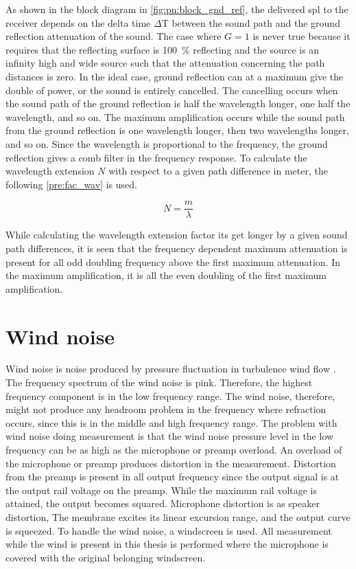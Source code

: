 As shown in the block diagram in \autoref{fig:pn:block_gnd_ref}, the delivered \gls{spl} to the receiver depends on the delta time $\Delta$T between the sound path and the ground reflection attenuation of the sound. The case where $G=1$ is never true because it requires that the reflecting surface is \SI{100}{\percent} reflecting and the source is an infinity high and wide source such that the attenuation concerning the path distances is zero. In the ideal case, ground reflection can at a maximum give the double of power,  or the sound is entirely cancelled. The cancelling occurs when the sound path of the ground reflection is half the wavelength longer, one half the wavelength, and so on. The maximum amplification occurs while the sound path from the ground reflection is one wavelength longer, then two wavelengths longer, and so on. Since the wavelength is proportional to the frequency, the ground reflection gives a comb filter in the frequency response. To calculate the wavelength extension $N$ with respect to a given path difference in meter, the following \autoref{pre:fac_wav} is used.

\begin{equation}\label{pre:fac_wav}
N = \frac{m}{\lambda}
\end{equation}  

\startexplain
{}
\stopexplain


While calculating the wavelength extension factor its get longer by a given sound path differences, it is seen that the frequency dependent maximum attenuation is present for all odd doubling frequency above the first maximum attenuation. In the maximum amplification, it is all the even doubling of the first maximum amplification.


\section{Wind noise}\label{pre:wind_noise}
Wind noise is noise produced by pressure fluctuation in turbulence wind flow \citep{doi:10.1121/1.4780400}. The frequency spectrum of the wind noise is pink. Therefore, the highest frequency component is in the low frequency range. The wind noise, therefore, might not produce any headroom problem in the frequency where refraction occurs, since this is in the middle and high frequency range. The problem with wind noise doing measurement is that the wind noise pressure level in the low frequency can be as high as the microphone or preamp overload. An overload of the microphone or preamp produces distortion in the measurement. Distortion from the preamp is present in all output frequency since the output signal is at the output rail voltage on the preamp. While the maximum rail voltage is attained, the output becomes squared. Microphone distortion is as speaker distortion, The membrane excites its linear excursion range, and the output curve is squeezed. To handle the wind noise, a windscreen is used. All measurement while the wind is present in this thesis is performed where the microphone is covered with the original belonging windscreen.  


 